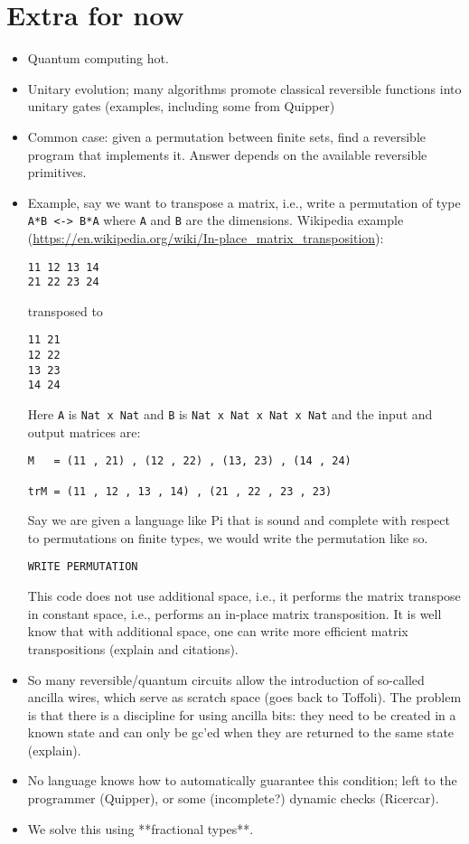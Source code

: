 \documentclass[sigplan,10pt,review,anonymous]{acmart}
\begin{document}
\section{Extra for now}

\begin{itemize}

\item Quantum computing hot.

\item Unitary evolution; many algorithms promote classical reversible
functions into unitary gates (examples, including some from Quipper)

\item Common case: given a permutation between finite sets, find a
  reversible program that implements it. Answer depends on the
  available reversible primitives.

\item Example, say we want to transpose a matrix, i.e., write a
  permutation of type \verb|A*B <-> B*A| where \verb|A| and \verb|B|
  are the dimensions. Wikipedia example
  (\url{https://en.wikipedia.org/wiki/In-place_matrix_transposition}):
\begin{verbatim}
11 12 13 14 
21 22 23 24 
\end{verbatim}
  transposed to
\begin{verbatim}
11 21
12 22
13 23
14 24
\end{verbatim}
  Here \verb|A| is \verb|Nat x Nat| and \verb|B| is
  \verb|Nat x Nat x Nat x Nat| and the input and output matrices are:
\begin{verbatim}
M   = (11 , 21) , (12 , 22) , (13, 23) , (14 , 24) 

trM = (11 , 12 , 13 , 14) , (21 , 22 , 23 , 23) 
\end{verbatim}
Say we are given a language like Pi that is sound and complete with
respect to permutations on finite types, we would write the
permutation like so.
\begin{verbatim}
WRITE PERMUTATION
\end{verbatim}
This code does not use additional space, i.e., it performs the matrix
transpose in constant space, i.e., performs an in-place matrix
transposition. It is well know that with additional space, one can
write more efficient matrix transpositions (explain and citations).

\item So many reversible/quantum circuits allow the introduction of
  so-called ancilla wires, which serve as scratch space (goes back to
  Toffoli). The problem is that there is a discipline for using
  ancilla bits: they need to be created in a known state and can only
  be gc'ed when they are returned to the same state (explain).

\item No language knows how to automatically guarantee this condition;
  left to the programmer (Quipper), or some (incomplete?) dynamic
  checks (Ricercar).

\item We solve this using **fractional types**.   

\end{itemize}
\end{document}
